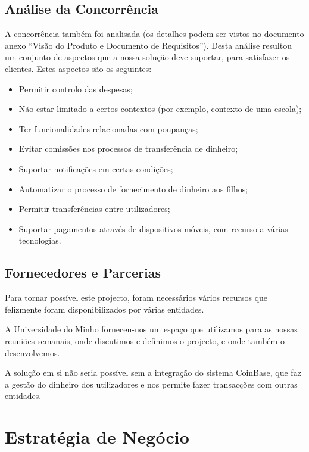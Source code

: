 \documentclass[12pt,a4paper]{article}
\begin{document}
\subsection{Análise da Concorrência}
\label{subsec:analise_da_concorrência}

A concorrência também foi analisada (os detalhes podem ser vistos no documento anexo “Visão do Produto e Documento de Requisitos”). Desta análise resultou um conjunto de aspectos que a nossa solução deve suportar, para satisfazer os clientes. Estes aspectos são os seguintes:

\begin{itemize}
\item Permitir controlo das despesas;
\item Não estar limitado a certos contextos (por exemplo, contexto de uma escola);
\item Ter funcionalidades relacionadas com poupanças;
\item Evitar comissões nos processos de transferência de dinheiro;
\item Suportar notificações em certas condições;
\item Automatizar o processo de fornecimento de dinheiro aos filhos;
\item Permitir transferências entre utilizadores;
\item Suportar pagamentos através de dispositivos móveis, com recurso a várias tecnologias.
\end{itemize}

\subsection{Fornecedores e Parcerias}
\label{subsec:fornecedores_e_parcerias}

Para tornar possível este projecto, foram necessários vários recursos que felizmente foram disponibilizados por várias entidades.

A Universidade do Minho forneceu-nos um espaço que utilizamos para as nossas reuniões semanais, onde discutimos e definimos o projecto, e onde também o desenvolvemos.

A solução em si não seria possível sem a integração do sistema CoinBase, que faz a gestão do dinheiro dos utilizadores e nos permite fazer transacções com outras entidades.

\newpage
\section{Estratégia de Negócio}
\label{sec:estrategia_de_negocio}
\end{document}
